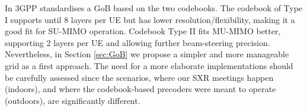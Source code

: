 In \cite{3gpp-codebooks} 3GPP standardises a GoB based on the two codebooks. The codebook of Type I supports until 8 layers per UE but has lower resolution/flexibility, making it a good fit for SU-MIMO operation. Codebook Type II fits MU-MIMO better, supporting 2 layers per UE and allowing further beam-steering precision. 
Nevertheless, in Section \ref{sec:GoB} we propose a simpler and more manageable grid as a first approach. The need for a more elaborate implementations should be carefully assessed since the scenarios, where our SXR meetings happen (indoors), and where the codebook-based precoders were meant to operate (outdoors), are significantly different.







